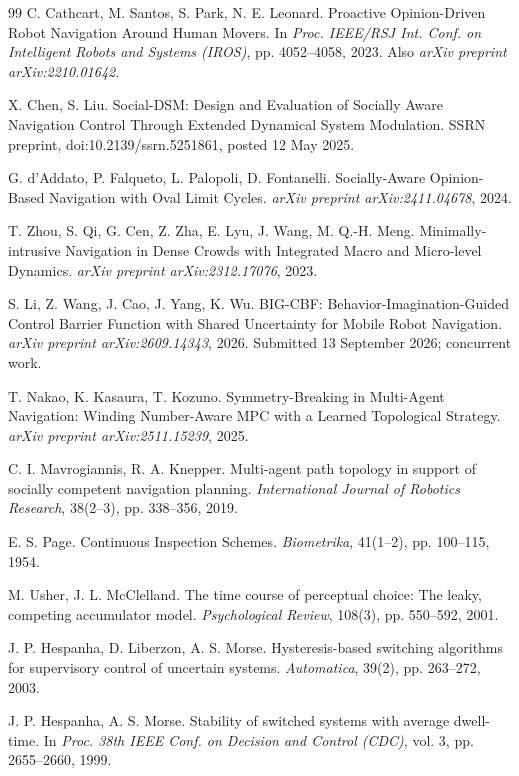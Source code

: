 \documentclass[11pt]{article}
\begin{document}
\begin{thebibliography}{99}
 C. Cathcart, M. Santos, S. Park, N. E. Leonard. Proactive Opinion-Driven Robot Navigation Around Human Movers. In \emph{Proc. IEEE/RSJ Int. Conf. on Intelligent Robots and Systems (IROS)}, pp. 4052--4058, 2023. Also \emph{arXiv preprint arXiv:2210.01642}.

 X. Chen, S. Liu. Social-DSM: Design and Evaluation of Socially Aware Navigation Control Through Extended Dynamical System Modulation. SSRN preprint, doi:10.2139/ssrn.5251861, posted 12 May 2025.

 G. d'Addato, P. Falqueto, L. Palopoli, D. Fontanelli. Socially-Aware Opinion-Based Navigation with Oval Limit Cycles. \emph{arXiv preprint arXiv:2411.04678}, 2024.

 T. Zhou, S. Qi, G. Cen, Z. Zha, E. Lyu, J. Wang, M. Q.-H. Meng. Minimally-intrusive Navigation in Dense Crowds with Integrated Macro and Micro-level Dynamics. \emph{arXiv preprint arXiv:2312.17076}, 2023.

 S. Li, Z. Wang, J. Cao, J. Yang, K. Wu. BIG-CBF: Behavior-Imagination-Guided Control Barrier Function with Shared Uncertainty for Mobile Robot Navigation. \emph{arXiv preprint arXiv:2609.14343}, 2026. Submitted 13 September 2026; concurrent work.

 T. Nakao, K. Kasaura, T. Kozuno. Symmetry-Breaking in Multi-Agent Navigation: Winding Number-Aware MPC with a Learned Topological Strategy. \emph{arXiv preprint arXiv:2511.15239}, 2025.

 C. I. Mavrogiannis, R. A. Knepper. Multi-agent path topology in support of socially competent navigation planning. \emph{International Journal of Robotics Research}, 38(2--3), pp. 338--356, 2019.

 E. S. Page. Continuous Inspection Schemes. \emph{Biometrika}, 41(1--2), pp. 100--115, 1954.

 M. Usher, J. L. McClelland. The time course of perceptual choice: The leaky, competing accumulator model. \emph{Psychological Review}, 108(3), pp. 550--592, 2001.

 J. P. Hespanha, D. Liberzon, A. S. Morse. Hysteresis-based switching algorithms for supervisory control of uncertain systems. \emph{Automatica}, 39(2), pp. 263--272, 2003.

 J. P. Hespanha, A. S. Morse. Stability of switched systems with average dwell-time. In \emph{Proc. 38th IEEE Conf. on Decision and Control (CDC)}, vol. 3, pp. 2655--2660, 1999.


\end{thebibliography}
\end{document}
